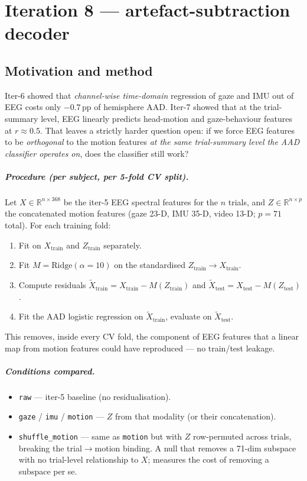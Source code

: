 \chapter{Iteration 8 --- artefact-subtraction decoder}
\label{ch:iter8}

\section{Motivation and method}

Iter-6 showed that \emph{channel-wise time-domain} regression of gaze
and IMU out of EEG costs only $-0.7$\,pp of hemisphere AAD. Iter-7 showed
that at the trial-summary level, EEG linearly predicts head-motion and
gaze-behaviour features at $r \approx 0.5$. That leaves a strictly
harder question open: if we force EEG features to be \emph{orthogonal}
to the motion features \emph{at the same trial-summary level the AAD
classifier operates on}, does the classifier still work?

\paragraph{Procedure (per subject, per 5-fold CV split).}
Let $X \in \mathbb{R}^{n \times 368}$ be the iter-5 EEG spectral
features for the $n$ trials, and $Z \in \mathbb{R}^{n \times p}$ the
concatenated motion features (gaze 23-D, IMU 35-D, video 13-D; $p=71$
total). For each training fold:
\begin{enumerate}
  \item Fit  on $X_\text{train}$ and
        $Z_\text{train}$ separately.
  \item Fit $M = \text{Ridge}(\alpha{=}10)$ on the standardised
        $Z_\text{train} \to X_\text{train}$.
  \item Compute residuals
        $\tilde X_\text{train} = X_\text{train} - M(Z_\text{train})$
        and $\tilde X_\text{test} = X_\text{test} - M(Z_\text{test})$.
  \item Fit the AAD logistic regression on $\tilde X_\text{train}$,
        evaluate on $\tilde X_\text{test}$.
\end{enumerate}
This removes, inside every CV fold, the component of EEG features that
a linear map from motion features could have reproduced --- no
train/test leakage.

\paragraph{Conditions compared.}
\begin{itemize}
  \item \texttt{raw} --- iter-5 baseline (no residualisation).
  \item \texttt{gaze} / \texttt{imu} / \texttt{motion} --- $Z$ from
        that modality (or their concatenation).
  \item \texttt{shuffle\_motion} --- same as \texttt{motion} but with
        $Z$ row-permuted across trials, breaking the trial$\to$motion
        binding. A null that removes a 71-dim subspace with no
        trial-level relationship to $X$; measures the cost of removing
        a subspace per se.
\end{itemize}

